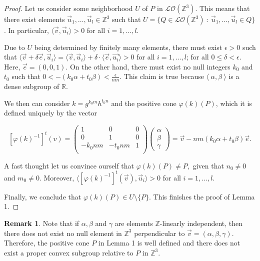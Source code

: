 \documentclass[12pt]{article}
\theoremstyle{definition}
\newtheorem{rem}{Remark}
\begin{document}
\begin{proof}
    Let us consider some neighborhood $U$ of $P$ in $\mathcal{LO}(\mathbb{Z}^3)$. This means that there exist elements $\vec{u}_1,\dots,\vec{u}_l\in \mathbb{Z}^3$ such that $U=\{Q\in \mathcal{LO}(\mathbb{Z}^3)\ :\ \vec{u}_1,\dots,\vec{u}_l\in Q\}$. In particular, $\langle\vec{v}, \vec{u}_i\rangle>0$ for all $i=1,\dots, l.$ 

    Due to $U$ being determined by finitely many elements, there must exist $\epsilon>0$ such that $\langle\vec{v} + \delta\vec{e},\vec{u}_i\rangle=\langle\vec{v}, \vec{u}_i\rangle+\delta\cdot\langle\vec{e}, \vec{u_i}\rangle>0$ for all $i=1,\dots,l$; for all $0\leq \delta<\epsilon.$ Here, $\vec{e}=(0,0,1)$. 
    On the other hand, there must exist no null integers $k_0$ and $t_0$ such that $0<-(k_0\alpha + t_0\beta)<\frac{\epsilon}{nm}$. This claim is true because $\langle\ \alpha,\beta\ \rangle$ is a dense subgroup of $\mathbb{R}$. 
    
    We then can consider $k=g^{k_0m}h^{t_0n}$ and the positive cone $\varphi(k)(P)$, which it is defined uniquely by the vector

    $$[\varphi(k)^{-1}]^t(v)=
    \left (
\begin{array}{ccc}
    1 & 0 & 0 \\
    0 & 1 & 0 \\
    -k_0nm & -t_0nm & 1  \\
\end{array}
\right )
\left (
\begin{array}{c}
     \alpha  \\
     \beta \\
     \gamma
\end{array}
\right ) = 
\vec{v} - nm(k_0\alpha + t_0\beta)\vec{e}.$$

A fast thought let us convince ourself that $\varphi(k)(P)\neq P,$ given that $n_0\neq 0$ and $m_0\neq 0$. Moreover, 
$\langle[\varphi(k)^{-1}]^t(\vec{v}), \vec{u}_i\rangle>0$ for all $i=1,\dots, l$. 

Finally, we conclude that $\varphi(k)(P)\in U\setminus\{P\}.$
This finishes the proof of Lemma 1.
\end{proof}

\begin{rem}
Note that if $\alpha, \beta$ and $\gamma$ are elements $\mathbb{Z}$-linearly independent, then there does not exist no null element in $\mathbb{Z}^3$ perpendicular to $\vec{v}=(\alpha,\beta,\gamma)$. Therefore, the positive cone $P$ in Lemma 1 is well defined and there does not exist a proper convex subgroup relative to $P$ in $\mathbb{Z}^3.$
\end{rem}
\end{document}
